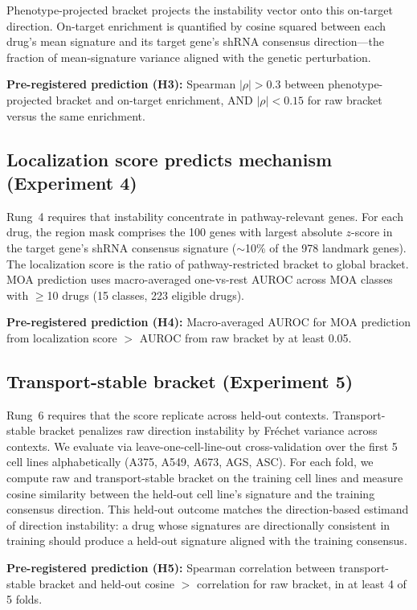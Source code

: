 \documentclass{article}
\begin{document}
Phenotype-projected bracket projects the instability vector onto this
on-target direction. On-target enrichment is quantified by cosine squared
between each drug's mean signature and its target gene's shRNA consensus
direction---the fraction of mean-signature variance aligned with the
genetic perturbation.

\textbf{Pre-registered prediction (H3):} Spearman $|\rho| > 0.3$ between
phenotype-projected bracket and on-target enrichment, AND $|\rho| < 0.15$
for raw bracket versus the same enrichment.

\subsection{Localization score predicts mechanism (Experiment 4)}

Rung~4 requires that instability concentrate in pathway-relevant genes.
For each drug, the region mask comprises the 100 genes with largest absolute
$z$-score in the target gene's shRNA consensus signature ($\sim$10\% of the
978 landmark genes). The localization score is the ratio of pathway-restricted
bracket to global bracket. MOA prediction uses macro-averaged one-vs-rest
AUROC across MOA classes with $\geq$10 drugs (15 classes, 223 eligible drugs).

\textbf{Pre-registered prediction (H4):} Macro-averaged AUROC for MOA
prediction from localization score $>$ AUROC from raw bracket by at least
0.05.

\subsection{Transport-stable bracket (Experiment 5)}

Rung~6 requires that the score replicate across held-out contexts.
Transport-stable bracket penalizes raw direction instability by Fr\'{e}chet
variance across contexts. We evaluate via leave-one-cell-line-out
cross-validation over the first 5 cell lines alphabetically (A375, A549,
A673, AGS, ASC). For each fold, we compute raw and transport-stable bracket
on the training cell lines and measure cosine similarity between the
held-out cell line's signature and the training consensus direction. This
held-out outcome matches the direction-based estimand of direction
instability: a drug whose signatures are directionally consistent in
training should produce a held-out signature aligned with the training
consensus.

\textbf{Pre-registered prediction (H5):} Spearman correlation between
transport-stable bracket and held-out cosine $>$ correlation for raw bracket,
in at least 4 of 5 folds.
\end{document}
